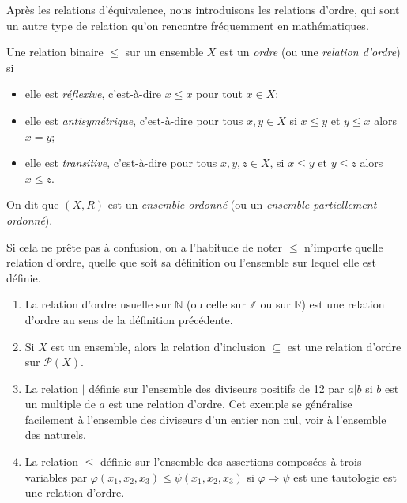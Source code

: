 \documentclass[french,course,oneside,theoremnosection]{lecture}
\newcommand{\R}{\mathbb{R}}
\newcommand{\N}{\mathbb{N}}
\newcommand{\Z}{\mathbb{Z}}
\newcommand{\iimplies}{\Rightarrow}
\begin{document}
Après les relations d'équivalence, nous introduisons les relations d'ordre, qui sont un autre type de relation qu'on rencontre fréquemment en mathématiques.
\begin{definition}
Une relation binaire $\leq$ sur un ensemble $X$ est un \emph{ordre} (ou une \emph{relation d'ordre}) si
\begin{itemize}
\item elle est \emph{réflexive}, c'est-à-dire $x\leq x$ pour tout $x\in X$;
\item elle est \emph{antisymétrique}, c'est-à-dire pour tous $x,y\in X$ si $x\leq y$ et $y\leq x$ alors $x=y$;
\item elle est \emph{transitive}, c'est-à-dire pour tous $x, y, z\in X$, si $x\leq y$ et $y\leq z$ alors $x\leq z$.
\end{itemize}
On dit que $(X,R)$ est un \emph{ensemble ordonné} (ou un \emph{ensemble partiellement ordonné}).
\end{definition}

\begin{notation}
Si cela ne prête pas à confusion, on a l'habitude de noter $\leq$ n'importe quelle relation d'ordre, quelle que soit sa définition ou l'ensemble sur lequel elle est définie.
\end{notation}

\begin{example}\label{ex:bqr}
\begin{enumerate}
\item La relation d'ordre usuelle sur $\N$ (ou celle sur $\Z$ ou sur $\R$) est une relation d'ordre au sens de la définition précédente.
\item Si $X$ est un ensemble, alors la relation d'inclusion $\subseteq$ est une relation d'ordre sur $\mathcal{P}(X)$.
\item\label{it:bqr} La relation $|$ définie sur l'ensemble des diviseurs positifs de 12 par $a | b$ si $b$ est un multiple de $a$ est une relation d'ordre. Cet exemple se généralise facilement à l'ensemble des diviseurs d'un entier non nul, voir à l'ensemble des naturels.
\item La relation $\leq$ définie sur l'ensemble des assertions composées à trois variables par $\varphi(x_1, x_2, x_3)\leq\psi(x_1, x_2, x_3)$ si $\varphi\iimplies \psi$ est une tautologie est une relation d'ordre.
\end{enumerate}
\end{example}
\end{document}
